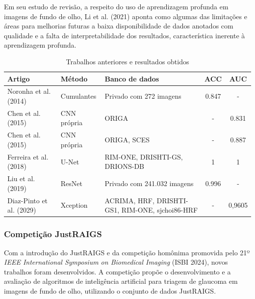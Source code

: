 \documentclass[12pt]{article}
\begin{document}
Em seu estudo de revisão, a respeito do uso de aprendizagem profunda em imagens de fundo de olho, Li et al. (2021) \cite{li_review_2021} aponta como algumas das limitações e áreas para melhorias futuras a baixa disponibilidade de dados anotados com qualidade e a falta de interpretabilidade dos resultados, característica inerente à aprendizagem profunda.

\begin{table}[htb]
    \centering
    \begin{tabular}{|l|l|p{3cm}|c|c|}
    \hline
    \textbf{Artigo} & \textbf{Método} & \textbf{Banco de dados} & \textbf{ACC} & \textbf{AUC} \\
    \hline
    Noronha et al. (2014)~\cite{noronha2014hoc} & Cumulantes  & Privado com 272 imagens        & 0.847 &  -    \\
    \hline
    Chen et al. (2015)~\cite{chen2015cnn}       & CNN própria & ORIGA                          & -     & 0.831 \\
    \hline
    Chen et al. (2015)~\cite{chen2015cnn}       & CNN própria & ORIGA, SCES                    & -     & 0.887 \\
    \hline
    Ferreira et al. (2018)~\cite{ferreira_cnn_2018} & U-Net   & RIM-ONE, DRISHTI-GS, DRIONS-DB & 1     & 1     \\
    \hline
    Liu et al. (2019)~\cite{liu_cnn_2019}       & ResNet      & Privado com 241.032 imagens    & 0.996 & -     \\
    \hline
    Diaz-Pinto et al. (2029)~\cite{liu_cnn_2019} & Xception & ACRIMA, HRF, DRISHTI-GS1, RIM-ONE, sjchoi86-HRF & - & 0,9605 \\
    \hline
    \end{tabular}
    \caption{Trabalhos anteriores e resultados obtidos}
    \label{tab:trabalhos}
\end{table}

\subsubsection{Competição JustRAIGS}
\label{sec:review:related:justraigs}

Com a introdução do JustRAIGS e da competição homônima promovida pelo 21º \textit{IEEE International Symposium on Biomedical Imaging} (ISBI 2024), novos trabalhos foram desenvolvidos. A competição propõe o desenvolvimento e a avaliação de algoritmos de inteligência artificial para triagem de glaucoma em imagens de fundo de olho, utilizando o conjunto de dados JustRAIGS.
\end{document}
